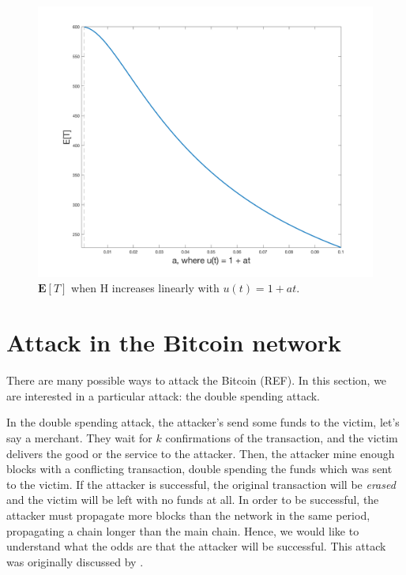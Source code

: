 \begin{figure}[ht]
\centering\includegraphics[width=\textwidth]{./images01/bitcoin-H-increasing.png}
\caption{$\mathbf{E}[T]$ when H increases linearly with $u(t) = 1 + at$.\label{fig-bitcoin-H-increase}}
\end{figure}


\section{Attack in the Bitcoin network}

\citet{karame2012two}

There are many possible ways to attack the Bitcoin (REF). In this section, we are interested in a particular attack: the double spending attack.

In the double spending attack, the attacker's send some funds to the victim, let's say a merchant. They wait for $k$ confirmations of the transaction, and the victim delivers the good or the service to the attacker. Then, the attacker mine enough blocks with a conflicting transaction, double spending the funds which was sent to the victim. If the attacker is successful, the original transaction will be \textit{erased} and the victim will be left with no funds at all. In order to be successful, the attacker must propagate more blocks than the network in the same period, propagating a chain longer than the main chain. Hence, we would like to understand what the odds are that the attacker will be successful. This attack was originally discussed by \citet{nakamoto2008bitcoin}.


